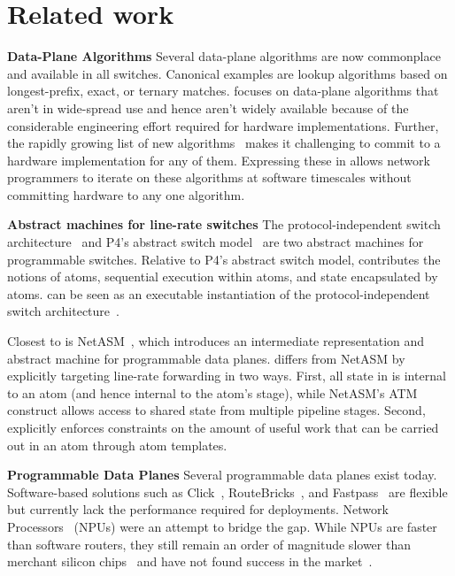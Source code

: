 \section{Related work}
\label{s:related}

\textbf{Data-Plane Algorithms}
Several data-plane algorithms are now commonplace and available in all
switches. Canonical examples are lookup algorithms based on longest-prefix,
exact, or ternary matches. \pktlanguage focuses on data-plane algorithms that
aren't in wide-spread use and hence aren't widely available because of the
considerable engineering effort required for hardware implementations. Further,
the rapidly growing list of new algorithms~\cite{pdq, d3, detail, codel, conga}
makes it challenging to commit to a hardware implementation for any of them.
Expressing these in \pktlanguage allows network programmers to iterate on these
algorithms at software timescales without committing hardware to any one
algorithm.

\textbf{Abstract machines for line-rate switches}
The protocol-independent switch architecture~\cite{nick_p4} and P4's abstract
switch model~\cite{p4} are two abstract machines for programmable switches.
Relative to P4's abstract switch model, \absmachine contributes the notions of
atoms, sequential execution within atoms, and state encapsulated by atoms.
\absmachine can be seen as an executable instantiation of the
protocol-independent switch architecture~\cite{nick_p4}.

Closest to \absmachine is NetASM~\cite{netasm}, which introduces an
intermediate representation and abstract machine for programmable data planes.
\absmachine differs from NetASM by explicitly targeting line-rate forwarding in
two ways.  First, all state in \absmachine is internal to an atom (and hence
internal to the atom's stage), while NetASM's ATM construct allows access to
shared state from multiple pipeline stages. Second, \absmachine explicitly
enforces constraints on the amount of useful work that can be carried out in an
atom through atom templates.

\textbf{Programmable Data Planes}
Several programmable data planes exist today. Software-based solutions such as
Click~\cite{click}, RouteBricks~\cite{routebricks}, and
Fastpass~\cite{fastpass} are flexible but currently lack the performance
required for deployments. Network Processors~\cite{ixp2800, ixp4xx} (NPUs) were
an attempt to bridge the gap.  While NPUs are faster than software routers,
they still remain an order of magnitude slower than merchant silicon
chips~\cite{rmt} and have not found success in the market~\cite{npfail}.

